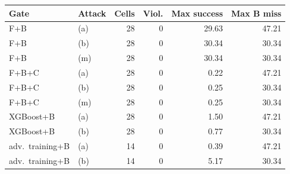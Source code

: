 \begin{tabular}{llrrrr}
\toprule
Gate & Attack & Cells & Viol. & Max success & Max B miss \\
\midrule
F+B & (a) & 28 & 0 & 29.63 & 47.21 \\
F+B & (b) & 28 & 0 & 30.34 & 30.34 \\
F+B & (m) & 28 & 0 & 30.34 & 30.34 \\
F+B+C & (a) & 28 & 0 & 0.22 & 47.21 \\
F+B+C & (b) & 28 & 0 & 0.25 & 30.34 \\
F+B+C & (m) & 28 & 0 & 0.25 & 30.34 \\
XGBoost+B & (a) & 28 & 0 & 1.50 & 47.21 \\
XGBoost+B & (b) & 28 & 0 & 0.77 & 30.34 \\
adv.\ training+B & (a) & 14 & 0 & 0.39 & 47.21 \\
adv.\ training+B & (b) & 14 & 0 & 5.17 & 30.34 \\
\bottomrule
\end{tabular}
